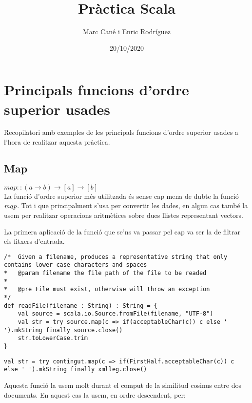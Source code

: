 \documentclass{report}
\begin{document}
\title{Pràctica Scala}
\author{Marc Cané i Enric Rodríguez}
\date{20/10/2020}
\maketitle

\newpage
\tableofcontents

\newpage
\chapter{Principals funcions d'ordre superior usades}

Recopilatori amb exemples de les principals funcions d'ordre superior usades a l'hora de realitzar aquesta pràctica.

\section{Map}

$ map :: (a \rightarrow b) \rightarrow [a] \rightarrow [b] $ \\

La funció d'ordre superior més utilitzada és sense cap mena de dubte la funció $ \emph{map} $. Tot i que principalment s'usa per convertir les dades, en algun cas també la usem per realitzar operacions aritmètices sobre dues llistes representant vectors.

La primera aplicació de la funció que se'ns va passar pel cap va ser la de filtrar els fitxers d'entrada.

\begin{lstlisting}[style=scalaHighlight]
/*	Given a filename, produces a representative string that only contains lower case characters and spaces
* 	@param filename the file path of the file to be readed
* 	
* 	@pre File must exist, otherwise will throw an exception
*/
def readFile(filename : String) : String = {
	val source = scala.io.Source.fromFile(filename, "UTF-8")
	val str = try source.map(c => if(acceptableChar(c)) c else ' ').mkString finally source.close()
	str.toLowerCase.trim
}
\end{lstlisting}

\begin{lstlisting}[style=scalaHighlight]
val str = try contingut.map(c => if(FirstHalf.acceptableChar(c)) c else ' ').mkString finally xmlleg.close()
\end{lstlisting}

Aquesta funció la usem molt durant el comput de la similitud cosinus entre dos documents. En aquest cas la usem, en ordre descendent, per:
\end{document}
